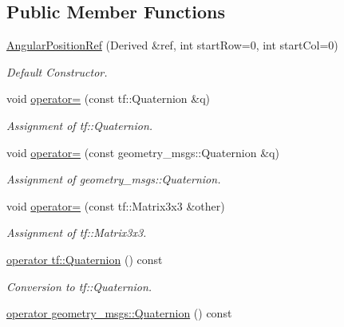 \subsection*{Public Member Functions}
\begin{DoxyCompactItemize}
\item 
\hyperlink{classow__core_1_1AngularPositionRef_aee0bb9a66511067009504119ffb5f2cc}{Angular\+Position\+Ref} (Derived \&ref, int start\+Row=0, int start\+Col=0)
\begin{DoxyCompactList}\small\item\em Default Constructor. \end{DoxyCompactList}\item 
void \hyperlink{classow__core_1_1AngularPositionRef_a0c67d3e57001c3f4b47983c6e2113410}{operator=} (const tf\+::\+Quaternion \&q)
\begin{DoxyCompactList}\small\item\em Assignment of tf\+::\+Quaternion. \end{DoxyCompactList}\item 
void \hyperlink{classow__core_1_1AngularPositionRef_a0698779622d693951e2c9c621c6c35f7}{operator=} (const geometry\+\_\+msgs\+::\+Quaternion \&q)
\begin{DoxyCompactList}\small\item\em Assignment of geometry\+\_\+msgs\+::\+Quaternion. \end{DoxyCompactList}\item 
void \hyperlink{classow__core_1_1AngularPositionRef_ae1e71403873af767a56ef0257e76b683}{operator=} (const tf\+::\+Matrix3x3 \&other)\hypertarget{classow__core_1_1AngularPositionRef_ae1e71403873af767a56ef0257e76b683}{}\label{classow__core_1_1AngularPositionRef_ae1e71403873af767a56ef0257e76b683}

\begin{DoxyCompactList}\small\item\em Assignment of tf\+::\+Matrix3x3. \end{DoxyCompactList}\item 
\hyperlink{classow__core_1_1AngularPositionRef_a93616aede6f30d7721f5b83f02f96d0d}{operator tf\+::\+Quaternion} () const \hypertarget{classow__core_1_1AngularPositionRef_a93616aede6f30d7721f5b83f02f96d0d}{}\label{classow__core_1_1AngularPositionRef_a93616aede6f30d7721f5b83f02f96d0d}

\begin{DoxyCompactList}\small\item\em Conversion to tf\+::\+Quaternion. \end{DoxyCompactList}\item 
\hyperlink{classow__core_1_1AngularPositionRef_ac36a2117df9ad13c8898c3336294c7d1}{operator geometry\+\_\+msgs\+::\+Quaternion} () const \hypertarget{classow__core_1_1AngularPositionRef_ac36a2117df9ad13c8898c3336294c7d1}{}\label{classow__core_1_1AngularPositionRef_ac36a2117df9ad13c8898c3336294c7d1}


\end{DoxyCompactItemize}
